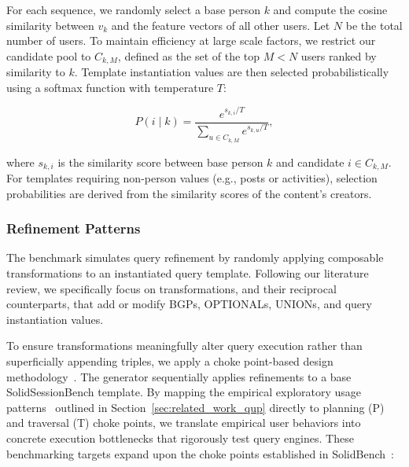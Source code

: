 For each sequence, we randomly select a base person $k$ and compute the cosine similarity 
between $v_{k}$ and the feature vectors of all other users.
Let $N$ be the total number of users. To maintain efficiency at large scale factors, 
we restrict our candidate pool to $C_{k,M}$, defined as the set of the top $M < N$ users 
ranked by similarity to $k$. 
Template instantiation values are then selected probabilistically using a softmax function 
with temperature $T$:

\begin{equation}
   P(i \mid k) = \frac{e^{s_{k,i} / T}}{\sum_{u \in C_{k,M}} e^{s_{k,u} / T}},
\end{equation}

where $s_{k,i}$ is the similarity score between base person $k$ and candidate $i \in C_{k,M}$. 
For templates requiring non-person values (e.g., posts or activities),
selection probabilities are derived from the similarity scores of the content's creators.

\subsubsection{Refinement Patterns}


The benchmark simulates query refinement by randomly applying composable 
transformations to an instantiated query template. 
Following our literature review, we specifically focus on transformations, and their reciprocal counterparts, that
add or modify BGPs, OPTIONALs, UNIONs, and query instantiation values.

To ensure transformations meaningfully alter query execution rather than superficially appending triples, 
we apply a choke point-based design methodology~\cite{angles2014linked}. 
The generator sequentially applies refinements to a base SolidSessionBench template. 
By mapping the empirical exploratory usage patterns~\cite{arenas2025exploring} outlined in Section~\ref{sec:related_work_qup} 
directly to planning (P) and traversal (T) choke points, 
we translate empirical user behaviors into concrete execution bottlenecks that rigorously test query engines. 
These benchmarking targets expand upon the choke points established in SolidBench~\cite{taelman2023link,taelman2023evaluation}:

